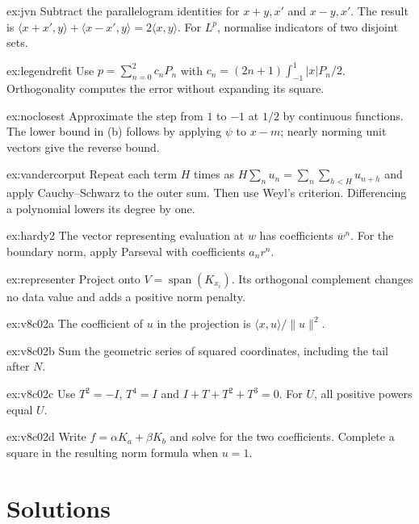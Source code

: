 \begin{hint}{ex:jvn}
Subtract the parallelogram identities for $x+y,x'$ and $x-y,x'$. The result is $\langle x+x',y\rangle+\langle x-x',y\rangle=2\langle x,y\rangle$. For $L^p$, normalise indicators of two disjoint sets.
\end{hint}
\begin{hint}{ex:legendrefit}
Use $p=\sum_{n=0}^2c_nP_n$ with $c_n=(2n+1)\int_{-1}^1|x|P_n/2$. Orthogonality computes the error without expanding its square.
\end{hint}
\begin{hint}{ex:noclosest}
Approximate the step from $1$ to $-1$ at $1/2$ by continuous functions. The lower bound in (b) follows by applying $\psi$ to $x-m$; nearly norming unit vectors give the reverse bound.
\end{hint}
\begin{hint}{ex:vandercorput}
Repeat each term $H$ times as $H\sum_nu_n=\sum_n\sum_{h<H}u_{n+h}$ and apply Cauchy--Schwarz to the outer sum. Then use Weyl's criterion. Differencing a polynomial lowers its degree by one.
\end{hint}
\begin{hint}{ex:hardy2}
The vector representing evaluation at $w$ has coefficients $\overline w^n$. For the boundary norm, apply Parseval with coefficients $a_nr^n$.
\end{hint}
\begin{hint}{ex:representer}
Project onto $V=\operatorname{span}(K_{x_i})$. Its orthogonal complement changes no data value and adds a positive norm penalty.
\end{hint}
\begin{hint}{ex:v8c02a}
The coefficient of $u$ in the projection is $\langle x,u\rangle/\|u\|^2$.
\end{hint}
\begin{hint}{ex:v8c02b}
Sum the geometric series of squared coordinates, including the tail after $N$.
\end{hint}
\begin{hint}{ex:v8c02c}
Use $T^2=-I$, $T^4=I$ and $I+T+T^2+T^3=0$. For $U$, all positive powers equal $U$.
\end{hint}
\begin{hint}{ex:v8c02d}
Write $f=\alpha K_a+\beta K_b$ and solve for the two coefficients. Complete a square in the resulting norm formula when $u=1$.
\end{hint}

\section{Solutions}

